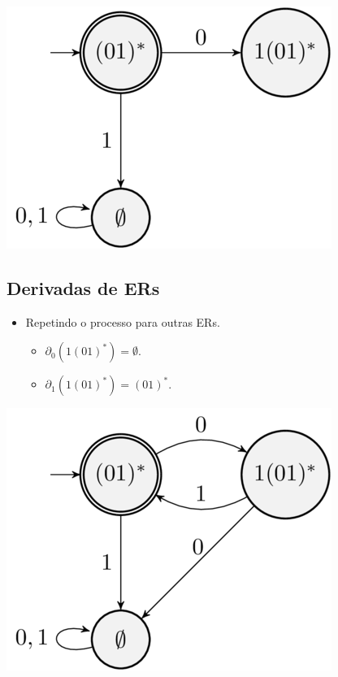 \documentclass[11pt]{article}
\begin{document}
\begin{center}
\includegraphics[width=.9\linewidth]{./imgs/image2.png}
\end{center}
\subsection*{Derivadas de ERs}
\label{sec:org03a8a90}

\begin{itemize}
\item Repetindo o processo para outras ERs.
\begin{itemize}
\item \(\partial_{0}(1(01)^*) = \emptyset\).
\item \(\partial_{1}(1(01)^*) = (01)^*\).
\end{itemize}
\end{itemize}

\begin{center}
\includegraphics[width=.9\linewidth]{./imgs/image3.png}
\end{center}
\end{document}
